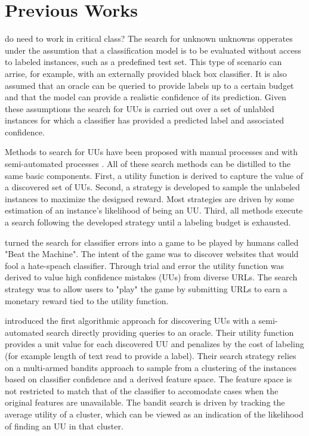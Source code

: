 \documentclass[letterpaper]{article} %
\newcommand{\wdb}[1]{{\color{blue} #1}} %
\begin{document}
\section{Previous Works}

\wdb{do need to work in critical class?}
The search for unknown unknowns opperates under the assumtion that a classification model is to be evaluated without access to labeled instances, such as a predefined test set. This type of scenario can arrise, for example, with an externally provided black box classifier.  It is also assumed that an oracle can be queried to provide labels up to a certain budget and that the model can provide a realistic confidence of its prediction.  Given these assumptions the search for UUs is carried out over a set of unlabled instances for which a classifier has provided a predicted label and associated confidence.  

Methods to search for UUs have been proposed with manual processes \citep{Attenberg2015} and with semi-automated processes \citep{Lakkaraju2016, Bansal2018}.  All of these search methods can be distilled to the same basic components.  First, a utility function is derived to capture the value of a discovered set of UUs. Second, a strategy is developed to sample the unlabeled instances to maximize the designed reward.  Most strategies are driven by some estimation of an instance's likelihood of being an UU.  Third, all methods execute a search following the developed strategy until a labeling budget is exhausted.

\citet{Attenberg2015} turned the search for classifier errors into a game to be played by humans called "Beat the Machine". The intent of the game was to discover websites that would fool a hate-speach classifier. Through trial and error the utility function was derived to value high confidence mistakes (UUs) from diverse URLs. The search strategy was to allow users to "play" the game by submitting URLs to earn a monetary reward tied to the utility function.   

\citet{Lakkaraju2016} introduced the first algorithmic approach for discovering UUs with a semi-automated search directly providing queries to an oracle.  Their utility function provides a unit value for each discovered UU and penalizes by the cost of labeling (for example length of text read to provide a label). Their search strategy relies on a multi-armed bandits approach to sample from a clustering of the instances based on classifier confidence and a derived feature space.  The feature space is not restricted to match that of the classifier to accomodate cases when the original features are unavailable.  The bandit search is driven by tracking the average utility of a cluster, which can be viewed as an indication of the likelihood of finding an UU in that cluster. 
\end{document}
